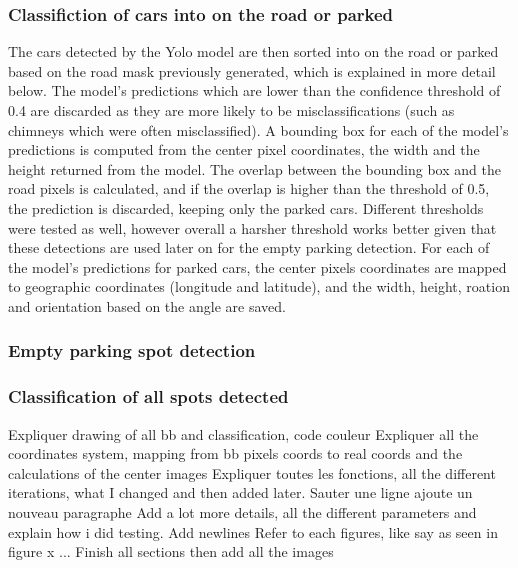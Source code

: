 \subsubsection{Classifiction of cars into on the road or parked}
The cars detected by the Yolo model are then sorted into on the road or parked based on the road mask previously generated, which is explained in more detail below.
The model's predictions which are lower than the confidence threshold of 0.4 are discarded as they are more likely to be misclassifications (such as chimneys which were often misclassified).
A bounding box for each of the model's predictions is computed from the center pixel coordinates, the width and the height returned from the model.
The overlap between the bounding box and the road pixels is calculated, and if the overlap is higher than the threshold of 0.5, the prediction is discarded, keeping only the parked cars.
Different thresholds were tested as well, however overall a harsher threshold works better given that these detections are used later on for the empty parking detection.
For each of the model's predictions for parked cars, the center pixels coordinates are mapped to geographic coordinates (longitude and latitude), and the width, height, roation and orientation based on the angle are saved.

\subsubsection{Empty parking spot detection}


\subsubsection{Classification of all spots detected}

Expliquer drawing of all bb and classification, code couleur
Expliquer all the coordinates system, mapping from bb pixels coords to real coords and the calculations of the center images
Expliquer toutes les fonctions, all the different iterations, what I changed and then added later.
Sauter une ligne ajoute un nouveau paragraphe
Add a lot more details, all the different parameters and explain how i did testing.
Add newlines
Refer to each figures, like say as seen in figure x ...
Finish all sections then add all the images